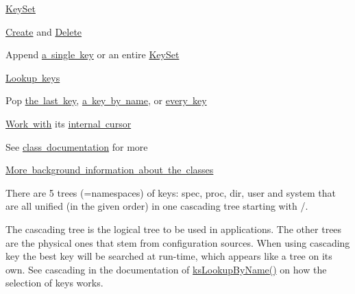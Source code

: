 \mbox{\hyperlink{group__keyset}{Key\+Set}}


\begin{DoxyItemize}
\item \mbox{\hyperlink{group__keyset_ga671e1aaee3ae9dc13b4834a4ddbd2c3c}{Create}} and \mbox{\hyperlink{group__keyset_ga27e5c16473b02a422238c8d970db7ac8}{Delete}}
\item Append \mbox{\hyperlink{group__keyset_gaa5a1d467a4d71041edce68ea7748ce45}{a single key}} or an entire \mbox{\hyperlink{group__keyset_ga21eb9c3a14a604ee3a8bdc779232e7b7}{Key\+Set}}
\item \mbox{\hyperlink{group__keyset_gaa34fc43a081e6b01e4120daa6c112004}{Lookup keys}}
\item Pop \mbox{\hyperlink{group__keyset_gae42530b04defb772059de0600159cf69}{the last key}}, \mbox{\hyperlink{group__keyset_gaa34fc43a081e6b01e4120daa6c112004}{a key by name}}, or \mbox{\hyperlink{group__keyset_gaba1f1dbea191f4d7e7eb3e4296ae7d5e}{every key}}
\item \mbox{\hyperlink{group__keyset_ga317321c9065b5a4b3e33fe1c399bcec9}{Work with}} its \mbox{\hyperlink{group__keyset_ga4287b9416912c5f2ab9c195cb74fb094}{internal cursor}}
\item See \mbox{\hyperlink{group__keyset}{class documentation}} for more
\end{DoxyItemize}

\mbox{\hyperlink{doc_dev_classes_md}{More background information about the classes}}

There are 5 trees (=namespaces) of keys\+: {\ttfamily spec}, {\ttfamily proc}, {\ttfamily dir}, {\ttfamily user} and {\ttfamily system} that are all unified (in the given order) in one cascading tree starting with {\ttfamily /}.

The cascading tree is the logical tree to be used in applications. The other trees are the physical ones that stem from configuration sources. When using cascading key the best key will be searched at run-\/time, which appears like a tree on its own. See cascading in the documentation of \mbox{\hyperlink{group__keyset_gad2e30fb6d4739d917c5abb2ac2f9c1a1}{ks\+Lookup\+By\+Name()}} on how the selection of keys works.


